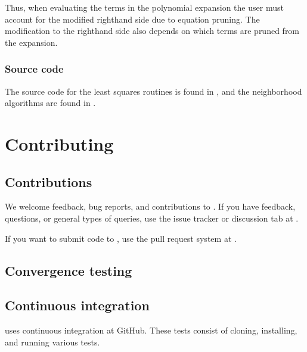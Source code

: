 \documentclass[letterpaper,10pt,english]{sphinxmanual}
\begin{document}
Thus, when evaluating the terms in the polynomial expansion the user must account for the modified right\sphinxhyphen{}hand side due to equation pruning.
The modification to the right\sphinxhyphen{}hand side also depends on which terms are pruned from the expansion.


\subsection{Source code}
\label{\detokenize{Utilities/LeastSquares:source-code}}
The source code for the least squares routines is found in , and the neighborhood algorithms are found in .


\chapter{Contributing}
\label{\detokenize{index:contributing}}

\section{Contributions}
\label{\detokenize{Contrib/Contributions:contributions}}\label{\detokenize{Contrib/Contributions:chap-contributions}}\label{\detokenize{Contrib/Contributions::doc}}
We welcome feedback, bug reports, and contributions to .
If you have feedback, questions, or general types of queries, use the issue tracker or discussion tab at .

If you want to submit code to , use the pull request system at .


\section{Convergence testing}
\label{\detokenize{Contrib/Convergence:convergence-testing}}\label{\detokenize{Contrib/Convergence:chap-convergence}}\label{\detokenize{Contrib/Convergence::doc}}

\section{Continuous integration}
\label{\detokenize{Contrib/CI:continuous-integration}}\label{\detokenize{Contrib/CI:chap-ci}}\label{\detokenize{Contrib/CI::doc}}
 uses continuous integration at GitHub.
These tests consist of cloning, installing, and running various  tests.
\end{document}
